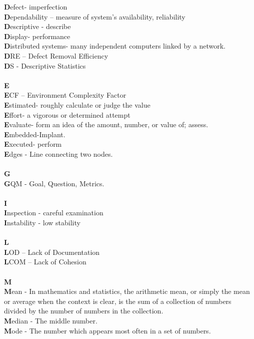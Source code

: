 \documentclass[a4paper, 11pt]{article}
\begin{document}
\textbf{D}efect- imperfection\\
\textbf{D}ependability – measure of system’s availability, reliability\\
\textbf{D}escriptive - describe\\
\textbf{D}isplay- performance\\
\textbf{D}istributed systems- many independent computers linked by a network.\\
\textbf{D}RE – Defect Removal Efficiency\\
\textbf{D}S - Descriptive Statistics \\ \\
\textbf{E}\\
\textbf{E}CF – Environment Complexity Factor\\
\textbf{E}stimated- roughly calculate or judge the value\\
\textbf{E}ffort- a vigorous or determined attempt\\
\textbf{E}valuate- form an idea of the amount, number, or value of; assess.\\
\textbf{E}mbedded-Implant.\\
\textbf{E}xecuted- perform\\
\textbf{E}dges - Line connecting two nodes.\\ \\
\textbf{G}\\
\textbf{G}QM - Goal, Question, Metrics.\\ \\
\textbf{I}\\
\textbf{I}nspection - careful examination\\
\textbf{I}nstability -  low stability\\ \\
\textbf{L}\\
\textbf{L}OD – Lack of Documentation\\
\textbf{L}COM – Lack of Cohesion\\ \\
\textbf{M}\\
\textbf{M}ean - In mathematics and statistics, the arithmetic mean, or simply the mean or average when the context is clear, is the sum of a collection of numbers divided by the number of numbers in the collection.\\
\textbf{M}edian - The middle number.\\
\textbf{M}ode - The number which appears most often in a set of numbers.\\ \\
\end{document}
